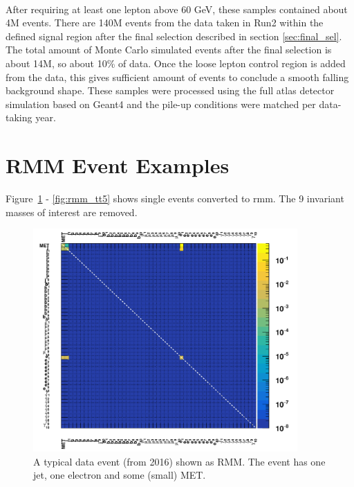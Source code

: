 \\
After requiring at least one lepton above 60 GeV, these samples contained about 4M events. There are 140M events from the data taken in Run2 within the defined signal region after the 
final selection described in section \ref{sec:final_sel}. The total amount of Monte Carlo simulated events after the final selection is about 14M, so about 10\% of data. Once the 
loose lepton control region is added from the data, this gives sufficient amount of events to conclude a smooth falling background shape. 
These samples were processed using the full \gls{atlas} detector simulation based on Geant4 and the pile-up conditions were matched per data-taking year. 
\newpage

\vspace*{0.6in}

\section{RMM Event Examples}
\label{appendix:rmm-event-examples}
\setcounter{equation}{0}

Figure~\ref{fig:rmm-data1} - \ref{fig:rmm_tt5} shows single events converted to \gls{rmm}. The 9 invariant masses of interest are removed.

\begin{figure}[H]
    \begin{center}
        \includegraphics[width=0.9\textwidth]{figs/app/validate_event1_data.pdf}
    \end{center}
    \caption{
    A typical data event (from 2016) shown as RMM.
    The event has one jet, one electron and some (small) MET.
    }
\label{fig:rmm-data1}
\end{figure}

